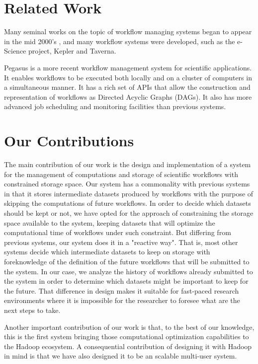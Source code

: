 \section{Related Work}
Many seminal works on the topic of workflow managing systems began to appear in the mid 2000's \citep[e.g.]{yu2005taxonomy, fox2006special, gil2007examining}, and many workflow systems were developed, such as the e-Science project\citep{deelman2009workflows}, Kepler\cite{altintas2004kepler} and Taverna\cite{oinn2006taverna}.  

Pegasus \citep{singh2008workflow} is a more recent workflow management system for scientific applications.  It enables workflows to be executed both locally and on a cluster of computers in a simultaneous manner.  It has a rich set of APIs that allow the construction and representation of workflows as Directed Acyclic Graphs (DAGs).  It also has more advanced job scheduling and monitoring facilities than previous systems.  

\section{Our Contributions}
The main contribution of our work is the design and implementation of a system for the management of computations and storage of scientific workflows with constrained storage space. Our system has a commonality with previous systems in that it stores intermediate datasets produced by workflows with the purpose of skipping the computations of future workflows.  In order to decide which datasets should be kept or not, we have opted for the  approach of constraining the storage space available to the system, keeping datasets that will optimize the computational time of workflows under such constraint. But differing from previous systems, our system does it in a "reactive way".  That is, most other systems decide which intermediate datasets to keep on storage with foreknowledge of the definition of the future workflows that will be submitted to the system.  In our case, we analyze the history of workflows already submitted to the system in order to determine which datasets might be important to keep for the future. That difference in design makes it suitable for fast-paced research environments where it is impossible for the researcher to foresee what are the next steps to take.

Another important contribution of our work is that, to the best of our knowledge, this is the first system bringing those computational optimization capabilities to the Hadoop ecosystem.  A consequential contribution of designing it with Hadoop in mind is that we have also designed it to be an scalable multi-user system.

